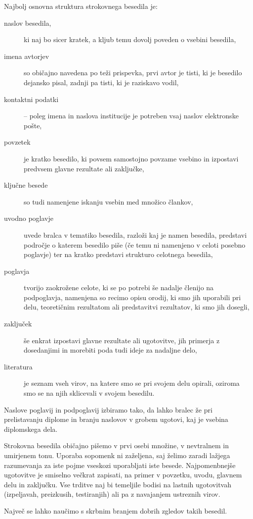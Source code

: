 \documentclass[a4paper, 12pt]{book}
\begin{document}
Najbolj osnovna struktura strokovnega besedila je:
\begin{description}
\item[naslov besedila,] ki naj bo sicer kratek, a kljub temu dovolj poveden o vsebini besedila,
\item[imena avtorjev] so običajno navedena po teži prispevka, prvi avtor je tisti, ki je besedilo dejansko pisal, zadnji pa tisti, ki je raziskavo vodil,
\item[kontaktni podatki] -- poleg imena in naslova institucije je potreben vsaj naslov elektronske pošte,
\item[povzetek] je kratko besedilo, ki povsem samostojno povzame vsebino in izpostavi predvsem  glavne rezultate ali zaključke,
\item[ključne besede] so tudi namenjene iskanju vsebin med množico člankov,
\item[uvodno poglavje] uvede bralca v tematiko besedila, razloži kaj je namen besedila, predstavi področje o katerem besedilo piše 
(če temu ni namenjeno v celoti posebno poglavje) ter na kratko predstavi strukturo celotnega besedila,
\item[poglavja] tvorijo zaokrožene celote, ki se po potrebi še nadalje členijo na podpoglavja, namenjena so recimo opisu orodij, 
ki smo jih uporabili pri delu, teoretičnim rezultatom ali predstavitvi rezultatov, ki smo jih dosegli,
\item[zaključek] še enkrat izpostavi glavne rezultate ali ugotovitve, jih primerja z dosedanjimi in morebiti poda tudi ideje za nadaljne delo,
\item[literatura] je seznam vseh virov, na katere smo se pri svojem delu opirali, oziroma smo se na njih sklicevali v svojem besedilu.
\end{description}

Naslove poglavij in podpoglavij izbiramo tako, da lahko bralec že pri prelistavanju diplome in branju naslovov
v grobem ugotovi, kaj je vsebina diplomskega dela.

Strokovna besedila običajno pišemo v prvi osebi množine, v nevtralnem in umirjenem tonu. 
Uporaba sopomenk ni zaželjena, saj želimo zaradi lažjega razumevanja za iste pojme vseskozi uporabljati iste besede.
Najpomenbnejše ugotovitve je smiselno večkrat zapisati, na primer v povzetku, uvodu, glavnem delu in zaključku.
Vse trditve naj bi temeljile bodisi na lastnih ugotovitvah (izpeljavah, preizkusih, testiranjih) ali pa z navajanjem ustreznih virov.

Največ se lahko naučimo s skrbnim branjem dobrih zgledov takih besedil.
\end{document}
